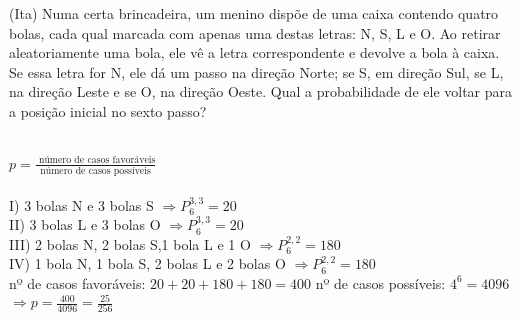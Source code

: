 \begin{ex}
  (Ita) Numa certa brincadeira, um menino dispõe de uma caixa contendo quatro bolas, cada qual marcada com apenas uma destas letras: N, S, L e O. Ao retirar aleatoriamente uma bola, ele vê a letra correspondente e devolve a bola à caixa. Se essa letra for N, ele dá um passo na direção Norte; se S, em direção Sul, se L, na direção Leste e se O, na direção Oeste. Qual a probabilidade de ele voltar para a posição inicial no sexto passo?
    \begin{sol}
    \phantom{A} \\
    \hspace{0,5cm}
    $p= \frac{\text{ número de casos favoráveis}}{\text{número de casos possíveis}}$ \\
    \\
    I) 3 bolas N e 3 bolas S  $ \Rightarrow P^{3,3}_6=20$ \\
    II) 3 bolas L e 3 bolas O  $\Rightarrow P^{3,3}_6=20$ \\
    III) 2 bolas N, 2 bolas S,1 bola L e 1 O $\Rightarrow P^{2,2}_6=180$ \\
    IV) 1 bola N, 1 bola S, 2 bolas L e 2 bolas O  $\Rightarrow P^{2,2}_6=180$ \\
    nº de casos favoráveis: $20+20+180+180=400$ \hspace{0,4cm}
    nº de casos possíveis: $4^6=4096$\\
    $\Longrightarrow p= \frac{400}{4096}=\frac{25}{256}$ 
    \end{sol}
  
 \end{ex}